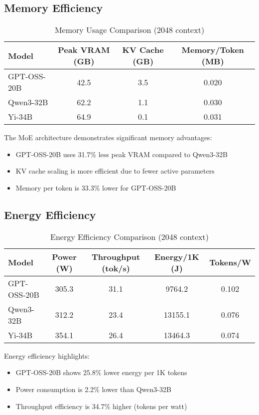 \documentclass[11pt]{article}
\begin{document}
\subsection{Memory Efficiency}

\begin{table}[h]
\centering
\caption{Memory Usage Comparison (2048 context)}
\begin{tabular}{lccc}
\toprule
Model & Peak VRAM (GB) & KV Cache (GB) & Memory/Token (MB) \\
\midrule
GPT-OSS-20B & 42.5 & 3.5 & 0.020 \\
Qwen3-32B & 62.2 & 1.1 & 0.030 \\
Yi-34B & 64.9 & 0.1 & 0.031 \\
\bottomrule
\end{tabular}
\end{table}

The MoE architecture demonstrates significant memory advantages:
\begin{itemize}
    \item GPT-OSS-20B uses 31.7\% less peak VRAM compared to Qwen3-32B
    \item KV cache scaling is more efficient due to fewer active parameters
    \item Memory per token is 33.3\% lower for GPT-OSS-20B
\end{itemize}

\subsection{Energy Efficiency}

\begin{table}[h]
\centering
\caption{Energy Efficiency Comparison (2048 context)}
\begin{tabular}{lcccc}
\toprule
Model & Power (W) & Throughput (tok/s) & Energy/1K (J) & Tokens/W \\
\midrule
GPT-OSS-20B & 305.3 & 31.1 & 9764.2 & 0.102 \\
Qwen3-32B & 312.2 & 23.4 & 13155.1 & 0.076 \\
Yi-34B & 354.1 & 26.4 & 13464.3 & 0.074 \\
\bottomrule
\end{tabular}
\end{table}

Energy efficiency highlights:
\begin{itemize}
    \item GPT-OSS-20B shows 25.8\% lower energy per 1K tokens
    \item Power consumption is 2.2\% lower than Qwen3-32B
    \item Throughput efficiency is 34.7\% higher (tokens per watt)
\end{itemize}
\end{document}
